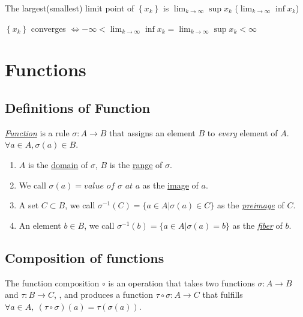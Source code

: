 \documentclass[11pt]{elegantbook}
\begin{document}
\begin{proposition}
    The largest(smallest) limit point of $\left\{x_{k}\right\}$ is $\lim _{k \rightarrow \infty}\sup x_{k}$ ($\lim _{k \rightarrow \infty}\inf x_{k}$)
\end{proposition}

\begin{proposition}
    $\left\{x_{k}\right\}$ converges $\Longleftrightarrow-\infty<\lim _{k \rightarrow \infty} \inf x_{k}=\lim _{k \rightarrow \infty}\sup x_{k}<\infty$
\end{proposition}





\section{Functions}
\subsection{Definitions of Function}
\begin{definition}[Function]
\normalfont
\underline{\textit{Function}} is a rule $\sigma:A\rightarrow B$ that assigns an element $B$ to \textit{every} element of $A$. $\forall a\in A, \sigma(a)\in B$.
\begin{enumerate}
    \item $A$ is the \underline{domain} of $\sigma$, $B$ is the \underline{range} of $\sigma$.
    \item We call $\sigma (a)= \textit{value of } \sigma\textit{ at } a$ as the \underline{image} of $a$.
    \item A set $C\subset B$, we call $\sigma^{-1}(C)=\{a\in A| \sigma(a)\in C\}$ as the \textit{\underline{preimage}} of $C$.
    \item An element $b\in B$, we call $\sigma^{-1}(b)=\{a\in A| \sigma(a)=b \}$ as the \textit{\underline{fiber}} of $b$.
\end{enumerate}
\end{definition}

\subsection{Composition of functions}
\begin{definition}
\normalfont
The function composition $\circ$ is an operation that takes two functions $\sigma: A\rightarrow B$ and $\tau: B\rightarrow C$, , and produces a function $\tau\circ \sigma:A\rightarrow C$ that fulfills $\forall a\in A,\ (\tau\circ \sigma)(a)=\tau( \sigma(a))$.
\end{definition}
\end{document}
